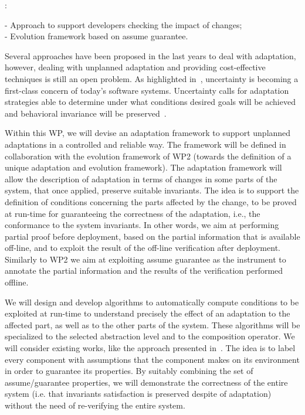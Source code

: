 \documentclass[12pt]{article}
\begin{document}
:
 
 - Approach to support developers checking the impact of changes;\\
 - Evolution framework based on assume guarantee.

\vspace{.2cm}

\noindent Several approaches have been proposed in the last years to deal with adaptation, however, dealing with unplanned adaptation and providing cost-effective techniques is still an open problem.  As highlighted in~\cite{ACD11,G10,G12}, uncertainty is becoming a first-class concern of today's software systems. Uncertainty calls for adaptation strategies able to determine under what conditions desired goals will be achieved and behavioral invariance will be preserved~\cite{ACD11,G10,G12}. 

Within this WP, we will devise an adaptation framework to support unplanned adaptations in a controlled and reliable way. The framework will be defined in collaboration with the evolution framework of WP2 (towards the definition of a unique adaptation and evolution framework). The adaptation framework will allow the description of adaptation in terms of changes in some parts of the system, that once applied, preserve suitable invariants. The idea is to support the definition of conditions concerning the parts affected by the change, to be proved at run-time for guaranteeing the correctness of the adaptation, i.e., the conformance to the system invariants. In other words, we aim at performing partial proof before deployment, based on the partial information that is available off-line, and to exploit the result of the off-line verification after deployment. 
Similarly to WP2 we aim at exploiting assume guarantee as the instrument to annotate the partial information and the results of the verification performed offline.  

We will design and develop algorithms to automatically compute conditions to be exploited at run-time to understand precisely the effect of an adaptation to the affected part, as well as to the other parts of the system. These algorithms will be specialized to the selected abstraction level and to the composition operator. We will consider existing works, like the approach presented in~\cite{Cobleigh2003}. The idea is to label every component with assumptions that the component makes on its environment in order to guarantee its properties. By suitably combining the set of assume/guarantee properties, we will demonstrate the correctness of the entire system (i.e. that invariants satisfaction is preserved despite of adaptation) without the need of re-verifying the entire system.
\end{document}
